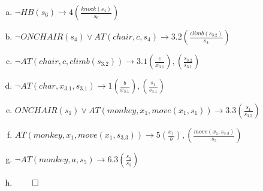 \documentclass[11pt]{article}
\begin{document}
\begin{enumerate}[(a)]
\item $\neg HB(s_6) \rightarrow 4 \left(\frac{knock(s_4)}{s_6}\right )$
\item $\neg ONCHAIR(s_4) \vee AT(chair, c, s_4) \rightarrow 3.2 \left(\frac{climb(s_{3.2})}{s_4}\right)$
\item $\neg AT(chair, c, climb(s_{3.2})) \rightarrow 3.1 \left(\frac{c}{x_{3.1}}\right), \left(\frac{s_{3.2}}{s_{3.1}}\right)$
\item $\neg AT(char, x_{3.1}, s_{3.1}) \rightarrow 1 \left(\frac{b}{x_{3.1}}\right), \left(\frac{s_1}{s_{3.1}}\right)$
\item $  ONCHAIR(s_1) \vee AT(monkey, x_1, move(x_1, s_1)) \rightarrow 3.3 \left(\frac{s_1}{s_{3.3}}\right)$
\item $ AT(monkey, x_1, move(x_1, s_{3.3})) \rightarrow 5 \left(\frac{x_1}{b}\right), \left(\frac{move(x_1,s_{3.3})}{s_5}\right)$
\item $ \neg AT(monkey, a, s_5) \rightarrow 6.3 \left(\frac{s_5}{s_0}\right) $
\item $\qed$
\end{enumerate}
\end{document}
